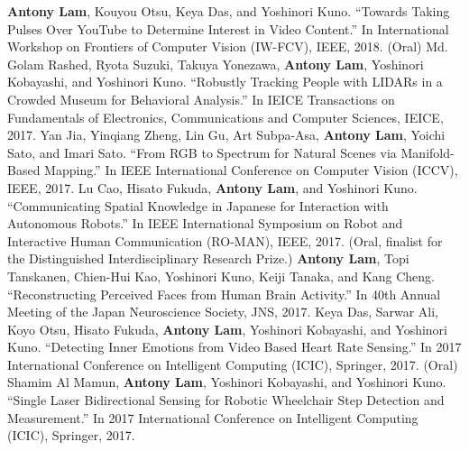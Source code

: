 \documentclass[letterpaper,10pt]{article}
\begin{document}
\textbf{Antony Lam}, Kouyou Otsu, Keya Das, and Yoshinori Kuno. ``Towards Taking Pulses Over YouTube to Determine
Interest in Video Content.'' In International Workshop on Frontiers of Computer Vision (IW-FCV), IEEE, 2018. (Oral)\vspace{0.05in}\newline
Md. Golam Rashed, Ryota Suzuki, Takuya Yonezawa, \textbf{Antony Lam}, Yoshinori Kobayashi, and Yoshinori Kuno. ``Robustly Tracking People with LIDARs in a Crowded Museum for Behavioral Analysis.'' In IEICE Transactions on Fundamentals of Electronics, Communications and Computer Sciences, IEICE, 2017.\vspace{0.05in}\newline
Yan Jia, Yinqiang Zheng, Lin Gu, Art Subpa-Asa, \textbf{Antony Lam}, Yoichi Sato, and Imari Sato. ``From RGB to Spectrum for Natural Scenes via Manifold-Based Mapping.'' In IEEE International Conference on Computer Vision (ICCV), IEEE, 2017.\vspace{0.05in}\newline
Lu Cao, Hisato Fukuda, \textbf{Antony Lam}, and Yoshinori Kuno. ``Communicating Spatial Knowledge in Japanese for Interaction with Autonomous Robots.'' In IEEE International Symposium on Robot and Interactive Human Communication (RO-MAN), IEEE,
2017. (Oral, finalist for the Distinguished Interdisciplinary Research Prize.)\vspace{0.05in}\newline\newline\newline
\textbf{Antony Lam}, Topi Tanskanen, Chien-Hui Kao, Yoshinori Kuno, Keiji Tanaka, and Kang Cheng. ``Reconstructing Perceived Faces from Human Brain Activity.'' In 40th Annual Meeting of the Japan Neuroscience Society, JNS, 2017.\vspace{0.05in}\newline
Keya Das, Sarwar Ali, Koyo Otsu, Hisato Fukuda,\textbf{ Antony Lam}, Yoshinori Kobayashi, and Yoshinori Kuno. ``Detecting Inner Emotions from Video Based Heart Rate Sensing.'' In 2017 International Conference on Intelligent Computing (ICIC), Springer, 2017. (Oral) \vspace{0.05in}\newline
Shamim Al Mamun, \textbf{Antony Lam}, Yoshinori Kobayashi, and Yoshinori Kuno. ``Single Laser Bidirectional Sensing for Robotic Wheelchair Step Detection and Measurement.'' In 2017 International Conference on Intelligent Computing (ICIC), Springer, 2017. \vspace{0.05in}\newline
\end{document}
